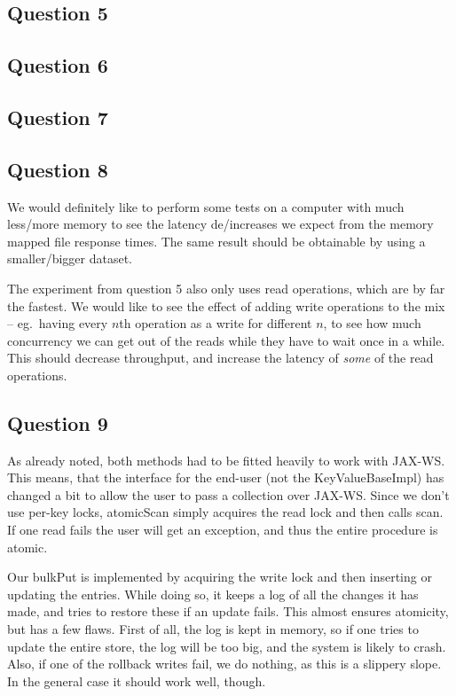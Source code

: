 \documentclass[a4paper,final]{article}
\newcommand{\mono}[1]{{\ttfamily#1}}
\begin{document}
\subsection*{Question 5}

\subsection*{Question 6}

\subsection*{Question 7}

\subsection*{Question 8}
We would definitely like to perform some tests on a computer with much
less/more memory to see the latency de/increases we expect from the
memory mapped file response times. The same result should be obtainable by
using a smaller/bigger dataset.

The experiment from question 5 also only uses \mono{read} operations, which
are by far the fastest. We would like to see the effect of adding \mono{write}
operations to the mix -- eg.~having every $n$th operation as a write for
different $n$, to see how much concurrency we can get out of the reads while
they have to wait once in a while. This should decrease throughput, and
increase the latency of \emph{some} of the read operations.

\subsection*{Question 9}
As already noted, both methods had to be fitted heavily to work with JAX-WS.
This means, that the interface for the end-user (not the
\mono{KeyValueBaseImpl}) has changed a bit to allow the user to pass a
collection over JAX-WS. Since we don't use per-key locks, \mono{atomicScan}
simply acquires the read lock and then calls \mono{scan}. If one read fails
the user will get an exception, and thus the entire procedure is atomic.

Our \mono{bulkPut} is implemented by acquiring the write lock and then
inserting or updating the entries. While doing so, it keeps a log of all the
changes it has made, and tries to restore these if an update fails. This
almost ensures atomicity, but has a few flaws. First of all, the log is kept
in memory, so if one tries to update the entire store, the log will be too
big, and the system is likely to crash. Also, if one of the rollback writes
fail, we do nothing, as this is a slippery slope. In the general case it
should work well, though.
\end{document}
